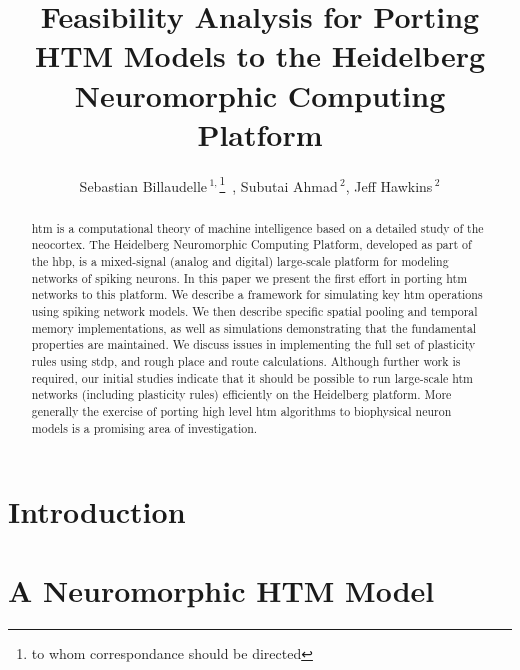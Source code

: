 \documentclass{reporter}
\begin{document}

\title[Porting HTM Models to a Neuromorphic Platform]{Feasibility Analysis for Porting HTM Models to the Heidelberg Neuromorphic Computing Platform}
\author[Billaudelle]{Sebastian Billaudelle\,$^{1,}$\footnote{to whom correspondance should be directed}\ , Subutai Ahmad\,$^{2}$, Jeff Hawkins\,$^{2}$}
\address{$^{1}$Kirchhoff-Institute for Physics, Heidelberg, Germany\\
$^{2}$Numenta, Inc., Redwood City, CA}



\maketitle

\begin{abstract}

\gls{htm} is a computational theory of machine
intelligence based on a detailed study of the neocortex. The Heidelberg
Neuromorphic Computing Platform, developed as part of the \gls{hbp},
is a mixed-signal (analog and digital) large-scale platform for
modeling networks of spiking neurons. In this paper we present the first effort
in porting \gls{htm} networks to this platform.  We describe a framework for
simulating key \gls{htm} operations  using spiking network models. We then describe
specific spatial pooling and temporal memory implementations, as well as
simulations demonstrating that the fundamental properties are maintained. We
discuss issues in implementing the full set of plasticity rules using \gls{stdp}, and
rough place and route calculations. Although further work is required, our
initial studies indicate that it should be  possible to run large-scale \gls{htm}
networks (including plasticity rules) efficiently on the Heidelberg platform.
More generally the exercise of porting high level \gls{htm} algorithms to biophysical
neuron models is a promising area of investigation.

\end{abstract}

\glsresetall

\section{Introduction}


\section{A Neuromorphic HTM Model}

\end{document}
